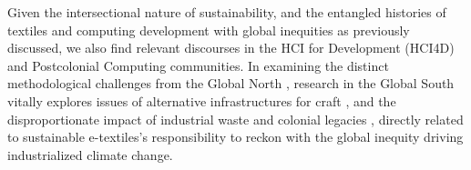 



Given the intersectional nature of sustainability, and the entangled histories of textiles and computing development with global inequities as previously discussed, we also find relevant discourses in the HCI for Development (HCI4D) and Postcolonial Computing communities. In examining the distinct methodological challenges from the Global North \cite{chetty_hci4d_2007}, research in the Global South vitally explores issues of alternative infrastructures for craft \cite{jack_infrastructure_2017, zhang_designing_2019}, and the disproportionate impact of industrial waste \cite{rifat_breaking_2019} and colonial legacies \cite{philip_postcolonial_2012, irani_postcolonial_2010}, directly related to sustainable e-textiles's responsibility to reckon with the global inequity driving industrialized climate change.




